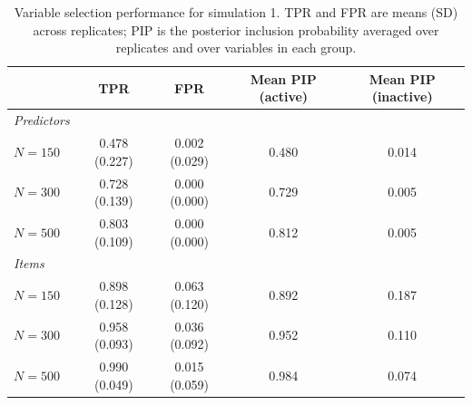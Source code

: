 \begin{table}[H]
\centering
\begin{tabular}{lcccc}
  \toprule
 & TPR & FPR & Mean PIP (active) & Mean PIP (inactive) \\ 
  \midrule
\textit{Predictors} &  &  &  &  \\ 
  $N = 150$ & 0.478 (0.227) & 0.002 (0.029) & 0.480 & 0.014 \\ 
  $N = 300$ & 0.728 (0.139) & 0.000 (0.000) & 0.729 & 0.005 \\ 
  $N = 500$ & 0.803 (0.109) & 0.000 (0.000) & 0.812 & 0.005 \\ 
   \midrule
\textit{Items} &  &  &  &  \\ 
  $N = 150$ & 0.898 (0.128) & 0.063 (0.120) & 0.892 & 0.187 \\ 
  $N = 300$ & 0.958 (0.093) & 0.036 (0.092) & 0.952 & 0.110 \\ 
  $N = 500$ & 0.990 (0.049) & 0.015 (0.059) & 0.984 & 0.074 \\ 
   \bottomrule
\end{tabular}
\caption{Variable selection performance for simulation 1. TPR and FPR are means (SD) across replicates; PIP is the posterior inclusion probability averaged over replicates and over variables in each group.} 
\label{table:sim1_var_sel_summary}
\end{table}
